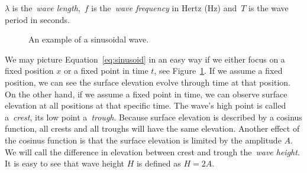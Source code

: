 $\lambda$ is the~\emph{wave length},~$f$ is the~\emph{wave frequency} in Hertz (Hz) and~$T$
is the wave period in seconds.
%
\begin{figure}
\centering
\caption{An example of a sinusoidal wave.}
\label{fig:sinusoid}
\end{figure}
%
We may picture Equation~\ref{eq:sinusoid} in an easy way if we either focus on a
fixed position $x$ or a fixed point in time $t$, see Figure~\ref{fig:sinusoid}.
If we assume a fixed position, we can see the surface elevation evolve through
time at that position. On the other hand, if we assume a fixed point in time, we
can observe surface elevation at all positions at that specific time. The wave's
high point is called a~\emph{crest}, its low point a~\emph{trough}. Because
surface elevation is described by a cosinus function, all crests and all troughs
will have the same elevation. Another effect of the cosinus function is that the
surface elevation is limited by the amplitude $A$. We will call the difference
in elevation between crest and trough the~\emph{wave height}. It is easy to see
that wave height $H$ is defined as $H=2A$.
%
